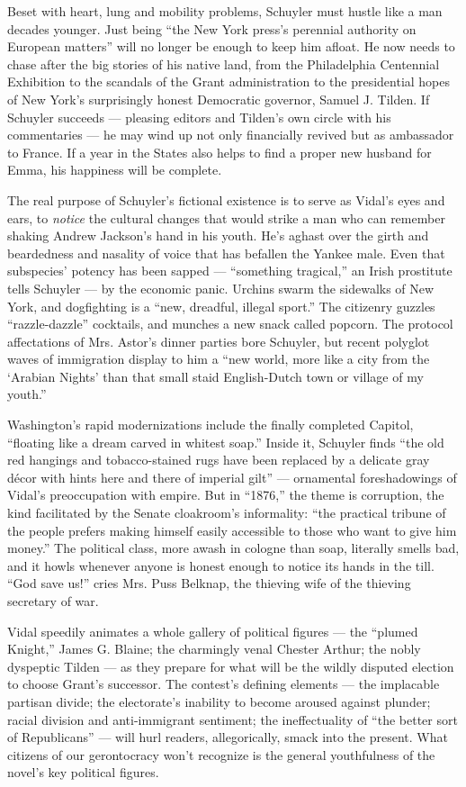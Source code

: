 Beset with heart, lung and mobility problems, Schuyler must hustle like
a man decades younger. Just being ``the New York press's perennial
authority on European matters'' will no longer be enough to keep him
afloat. He now needs to chase after the big stories of his native land,
from the Philadelphia Centennial Exhibition to the scandals of the Grant
administration to the presidential hopes of New York's surprisingly
honest Democratic governor, Samuel J. Tilden. If Schuyler succeeds ---
pleasing editors and Tilden's own circle with his commentaries --- he
may wind up not only financially revived but as ambassador to France. If
a year in the States also helps to find a proper new husband for Emma,
his happiness will be complete.

The real purpose of Schuyler's fictional existence is to serve as
Vidal's eyes and ears, to \emph{notice} the cultural changes that would
strike a man who can remember shaking Andrew Jackson's hand in his
youth. He's aghast over the girth and beardedness and nasality of voice
that has befallen the Yankee male. Even that subspecies' potency has
been sapped --- ``something tragical,'' an Irish prostitute tells
Schuyler --- by the economic panic. Urchins swarm the sidewalks of New
York, and dogfighting is a ``new, dreadful, illegal sport.'' The
citizenry guzzles ``razzle-dazzle'' cocktails, and munches a new snack
called popcorn. The protocol affectations of Mrs. Astor's dinner parties
bore Schuyler, but recent polyglot waves of immigration display to him a
``new world, more like a city from the `Arabian Nights' than that small
staid English-Dutch town or village of my youth.''

Washington's rapid modernizations include the finally completed Capitol,
``floating like a dream carved in whitest soap.'' Inside it, Schuyler
finds ``the old red hangings and tobacco-stained rugs have been replaced
by a delicate gray décor with hints here and there of imperial gilt''
--- ornamental foreshadowings of Vidal's preoccupation with empire. But
in ``1876,'' the theme is corruption, the kind facilitated by the Senate
cloakroom's informality: ``the practical tribune of the people prefers
making himself easily accessible to those who want to give him money.''
The political class, more awash in cologne than soap, literally smells
bad, and it howls whenever anyone is honest enough to notice its hands
in the till. ``God save us!'' cries Mrs. Puss Belknap, the thieving wife
of the thieving secretary of war.

Vidal speedily animates a whole gallery of political figures --- the
``plumed Knight,'' James G. Blaine; the charmingly venal Chester Arthur;
the nobly dyspeptic Tilden --- as they prepare for what will be the
wildly disputed election to choose Grant's successor. The contest's
defining elements --- the implacable partisan divide; the electorate's
inability to become aroused against plunder; racial division and
anti-immigrant sentiment; the ineffectuality of ``the better sort of
Republicans'' --- will hurl readers, allegorically, smack into the
present. What citizens of our gerontocracy won't recognize is the
general youthfulness of the novel's key political figures.

